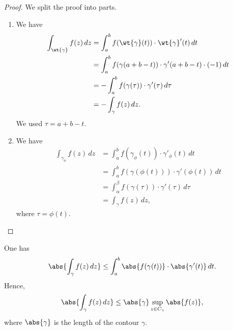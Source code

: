\documentclass[12pt, a4paper]{article}
\begin{document}
\begin{proof}
    We split the proof into parts.
    \begin{enumerate}
        \item We have 
        \[\begin{aligned}
            \int_{\wt{\gamma}} f(z) \, dz &= \int_a^b f(\wt{\gamma}(t)) \cdot \wt{\gamma}'(t) \, dt \\
            &= \int_a^b f(\gamma(a+b-t)) \cdot \gamma'(a+b-t) \cdot (-1) \, dt \\
            &= - \int_a^b f(\gamma(\tau)) \cdot \gamma'(\tau) \, d\tau \\
            &= - \int_{\gamma} f(z) \, dz.
        \end{aligned}\]
        We used \(\tau=a+b-t\).
        \item We have 
        \[\begin{aligned}
            \int_{\gamma_{\phi}} f(z) \, dz &= \int_a^b f(\gamma_{\phi}(t)) \cdot \gamma'_{\phi}(t) \, dt \\
            &= \int_a^b f(\gamma(\phi(t))) \cdot \gamma'(\phi(t)) \, dt \\
            &= \int_{\alpha}^{\beta} f(\gamma(\tau))\cdot \gamma'(\tau) \, d\tau \\
            &= \int_{\gamma} f(z) \, dz,
        \end{aligned}\]
        where \(\tau = \phi(t)\).
    \end{enumerate}
\end{proof}

\begin{mdthm}
    One has 
    \[\abs{\int_{\gamma} f(z) \, dz } \leq \int_a^b \abs{f(\gamma(t))} \cdot \abs{\gamma'(t)} \, dt.\]
    Hence, 
    \[\abs{\int_{\gamma} f(z) \, dz } \leq \abs{\gamma} \sup_{z \in C_{\gamma}} \abs{f(z)},\]
    where \(\abs{\gamma}\) is the length of the contour \(\gamma\).
\end{mdthm}
\end{document}
